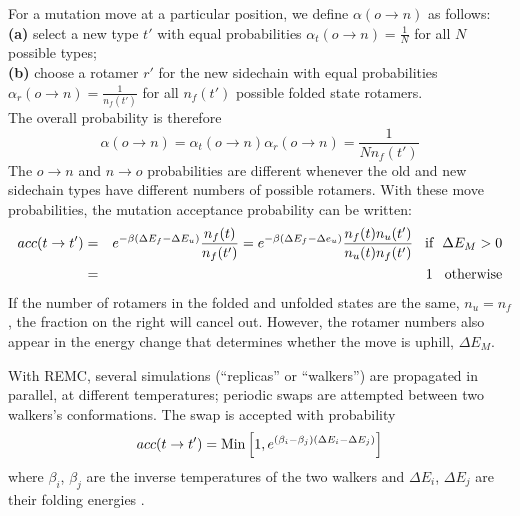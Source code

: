 \documentclass[a4paper,12pt]{article}
\begin{document}
For a mutation move at a particular position, we define $\alpha(o \rightarrow n)$ as follows: \\
{\bf (a)} select a new type $t'$ with equal probabilities $\alpha_t(o \rightarrow n) = \frac{1}{N}$ 
for all $N$ possible types; \\
{\bf (b)} choose a rotamer $r'$ for the new sidechain with equal probabilities $\alpha_r(o \rightarrow n) 
= \frac{1}{n_f(t')}$ for all $n_f(t')$ possible folded state rotamers. \\
The overall probability is therefore
\begin{equation}
\alpha(o \rightarrow n) = \alpha_t(o \rightarrow n) \alpha_r(o \rightarrow n) = \frac{1}{N n_f(t')}
\end{equation}
The $o \rightarrow n$ and $n \rightarrow o$ probabilities are different whenever the old and new sidechain
types have different numbers of possible rotamers. With these move probabilities, the mutation acceptance
probability can be written:
\begin{eqnarray} \label{eq:rule2}
acc(t \rightarrow t') &=& e^{-\beta (\Delta E_f - \Delta E_u)} \frac{ n_f(t) }{ n_f(t') }
 = e^{-\beta (\Delta E_f - \Delta e_u)} \frac{ n_f(t) n_u(t') }{ n_u(t) n_f(t') } 
             {\rm \hspace*{3mm} if \hspace*{2mm} } \Delta E_M > 0 \\
                      &=& 1 {\rm \hspace*{3mm} otherwise}
\end{eqnarray}
If the number of rotamers in the folded and unfolded states are the same, $n_u = n_f$, the fraction on the right
will cancel out. However, the rotamer numbers also appear in the energy change that determines whether the move is
uphill, $\Delta E_M$.

With REMC, several simulations (``replicas'' or ``walkers'') are propagated in parallel, at different temperatures;
periodic swaps are attempted between two walkers's conformations. The swap is accepted with probability
\begin{equation} \label{eq:remc}
acc(t \rightarrow t') = {\rm Min} \left[ 1, e^{(\beta_i - \beta_j)(\Delta E_i - \Delta E_j)} \right]
\end{equation}
where $\beta_i$, $\beta_j$ are the inverse temperatures of the two walkers and $\Delta E_i$, $\Delta E_j$
are their folding energies \cite{Kofke02,Earl05}.
\end{document}
